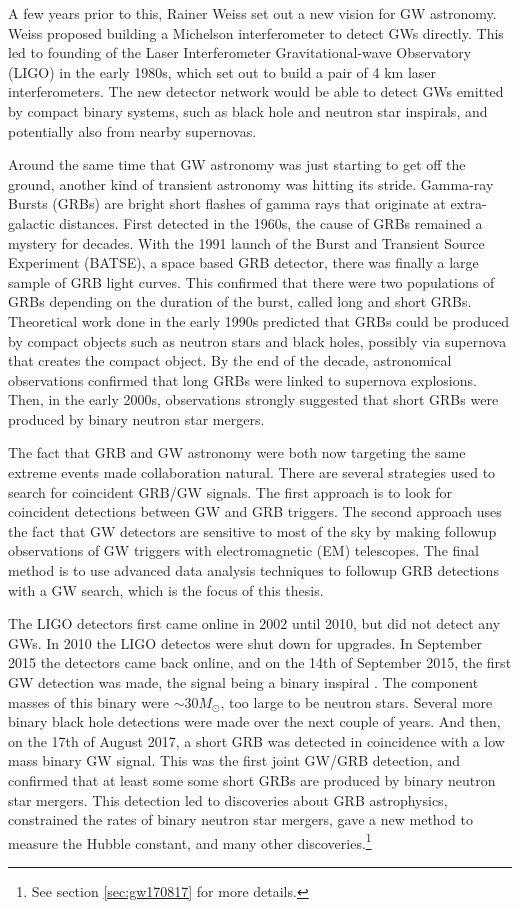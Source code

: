 \documentclass[11pt]{cuthesis}
\begin{document}
A few years prior to this, Rainer Weiss set out a new vision for GW astronomy. Weiss proposed building a Michelson interferometer to detect GWs directly. \cite{weiss72} This led to founding of the Laser Interferometer Gravitational-wave Observatory (LIGO) in the early 1980s, which set out to build a pair of 4 km laser interferometers. The new detector network would be able to detect GWs emitted by compact binary systems, such as black hole and neutron star inspirals, and potentially also from nearby supernovas. 

Around the same time that GW astronomy was just starting to get off the ground, another kind of transient astronomy was hitting its stride. Gamma-ray Bursts (GRBs) are bright short flashes of gamma rays that originate at extra-galactic distances. First detected in the 1960s, the cause of GRBs remained a mystery for decades. With the 1991 launch of the Burst and Transient Source Experiment (BATSE), a space based GRB detector, there was finally a large sample of GRB light curves. This confirmed that there were two populations of GRBs depending on the duration of the burst, called long and short GRBs. Theoretical work done in the early 1990s predicted that GRBs could be produced by compact objects such as neutron stars and black holes, possibly via supernova that creates the compact object. By the end of the decade, astronomical observations confirmed that long GRBs were linked to supernova explosions. Then, in the early 2000s, observations strongly suggested that short GRBs were produced by binary neutron star mergers. 

The fact that GRB and GW astronomy were both now targeting the same extreme events made collaboration natural. There are several strategies used to search for coincident GRB/GW signals. The first approach is to look for coincident detections between GW and GRB triggers. The second approach uses the fact that GW detectors are sensitive to most of the sky by making followup observations of GW triggers with electromagnetic (EM) telescopes. The final method is to use advanced data analysis techniques to followup GRB detections with a GW search, which is the focus of this thesis. 

The LIGO detectors first came online in 2002 until 2010, but did not detect any GWs. In 2010 the LIGO detectos were shut down for upgrades. In September 2015 the detectors came back online, and on the 14th of September 2015, the first GW detection was made, the signal being a binary inspiral \cite{150914-det-paper}. The component masses of this binary were $\sim 30M_\odot$, too large to be neutron stars. Several more binary black hole detections were made over the next couple of years. \cite{catalog} And then, on the 17th of August 2017, a short GRB was detected in coincidence with a low mass binary GW signal. \cite{GW170817_det} This was the first joint GW/GRB detection, and confirmed that at least some some short GRBs are produced by binary neutron star mergers. This detection led to discoveries about GRB astrophysics, constrained the rates of binary neutron star mergers, gave a new method to measure the Hubble constant, and many other discoveries.\footnote{See section \ref{sec:gw170817} for more details.}
\end{document}
